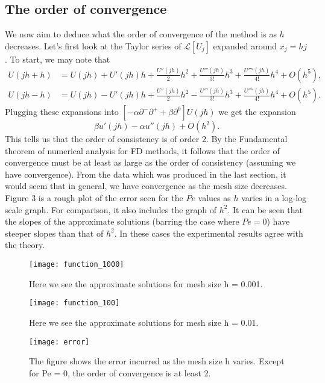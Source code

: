 \documentclass[10pt]{article}
\begin{document}
\subsection{The order of convergence}

We now aim to deduce what the order of convergence of the method is as $h$ decreases. Let's first look at the Taylor series of $\mathcal{L}[U_j]$ expanded around $x_j = hj$. To start, we may note that
\begin{align*}
    U(jh + h) &= U(jh) + U'(jh)h + \frac{U''(jh)}{2}h^2 + \frac{U'''(jh)}{3!}h^3 + \frac{U''''(jh)}{4!}h^4 + O(h^5), \\
    U(jh - h) &= U(jh) - U'(jh)h + \frac{U''(jh)}{2}h^2 - \frac{U'''(jh)}{3!}h^3 + \frac{U''''(jh)}{4!}h^4 + O(h^5).
\end{align*}
Plugging these expansions into $[-\alpha \partial^-\partial^+ + \beta \partial^0]U(jh)$ we get the expansion
\[ \beta u'(jh)  -\alpha u ''(jh) + O(h^2).  \]
This tells us that the order of consistency is of order $2$. By the Fundamental theorem of numerical analysis for FD methods, it follows that the order of convergence must be at least as large as the order of consistency (assuming we have convergence). From the data which was produced in the last section, it would seem that in general, we have convergence as the mesh size decreases. Figure 3 is a rough plot of the error seen for the $Pe$ values as $h$ varies in a log-log scale graph. For comparison, it also includes the graph of $h^2$. It can be seen that the slopes of the approximate solutions (barring the case where $Pe=0$) have steeper slopes than that of $h^2$. In these cases the experimental results agree with the theory.

\clearpage

 \begin{figure}
 \begin{center}
    \texttt{[image: function\_1000]}
  \end{center}
  \caption{Here we see the approximate solutions for mesh size h = 0.001.
  \label{fig:func_and_deriv}}
\end{figure}

 \begin{figure}
 \begin{center}
    \texttt{[image: function\_100]}
  \end{center}
  \caption{Here we see the approximate solutions for mesh size h = 0.01.
  \label{fig:func2}}
\end{figure}

 \begin{figure}
 \begin{center}
    \texttt{[image: error]}
  \end{center}
  \caption{The figure shows the error incurred as the mesh size h varies. Except for Pe = 0, the order of convergence is at least 2.
  \label{fig:func2}}
\end{figure}
\end{document}

